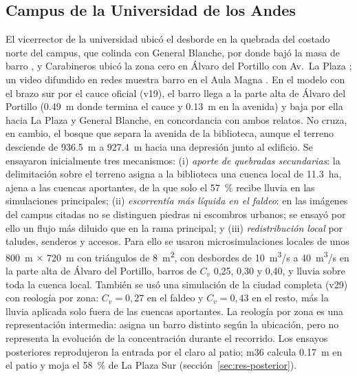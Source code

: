 \subsection{Campus de la Universidad de los Andes}\label{sec:res-campus}
El vicerrector de la universidad ubicó el desborde en la quebrada del costado norte del campus, que colinda con General Blanche, por donde bajó la masa de barro \citep{cooperativa2026}, y Carabineros ubicó la zona cero en Álvaro del Portillo con Av.\ La Plaza \citep{latercera2026zonacero}; un video difundido en redes muestra barro en el Aula Magna \citep{quintaconectado2026}. En el modelo con el brazo sur por el cauce oficial (v19), el barro llega a la parte alta de Álvaro del Portillo (\SI{0,49}{m} donde termina el cauce y \SI{0,13}{m} en la avenida) y baja por ella hacia La Plaza y General Blanche, en concordancia con ambos relatos. No cruza, en cambio, el bosque que separa la avenida de la biblioteca, aunque el terreno desciende de \SI{936,5}{m} a \SI{927,4}{m} hacia una depresión junto al edificio. Se ensayaron inicialmente tres mecanismos: (i) \emph{aporte de quebradas secundarias}: la delimitación sobre el terreno asigna a la biblioteca una cuenca local de \SI{11,3}{ha}, ajena a las cuencas aportantes, de la que solo el \SI{57}{\percent} recibe lluvia en las simulaciones principales; (ii) \emph{escorrentía más líquida en el faldeo}: en las imágenes del campus citadas no se distinguen piedras ni escombros urbanos; se ensayó por ello un flujo más diluido que en la rama principal; y (iii) \emph{redistribución local} por taludes, senderos y accesos. Para ello se usaron microsimulaciones locales de unos \SI{800}{m} $\times$ \SI{720}{m} con triángulos de \SI{8}{m^2}, con desbordes de \SI{10}{m^3/s} a \SI{40}{m^3/s} en la parte alta de Álvaro del Portillo, barros de $C_v$ 0,25, 0,30 y 0,40, y lluvia sobre toda la cuenca local. También se usó una simulación de la ciudad completa (v29) con reología por zona: $C_v=0{,}27$ en el faldeo y $C_v=0{,}43$ en el resto, más la lluvia aplicada solo fuera de las cuencas aportantes. La reología por zona es una representación intermedia: asigna un barro distinto según la ubicación, pero no representa la evolución de la concentración durante el recorrido. Los ensayos posteriores reprodujeron la entrada por el claro al patio; m36 calcula \SI{0,17}{m} en el patio y moja el \SI{58}{\percent} de La Plaza Sur (sección~\ref{sec:res-posterior}).

